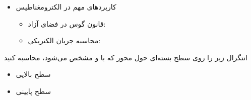 \begin{ELjoin}

\begin{itemize}
\tightlist
\item
  کاربردهای مهم در الکترومغناطیس

  \begin{itemize}
  \item
    قانون گوس در فضای آزاد:
  \item
    محاسبه جریان الکتریکی:
  \end{itemize}
\end{itemize}


\begin{ELexample}{}

انتگرال زیر را روی سطح بسته‌ای حول محور  که با  و  مشخص می‌شود، محاسبه کنید



\begin{ELsolution}


\begin{itemize}
\tightlist
\item
  سطح بالایی
\end{itemize}


\begin{itemize}
\tightlist
\item
  سطح پایینی
\end{itemize}


\end{ELsolution}
\end{ELexample}
\end{ELjoin}

